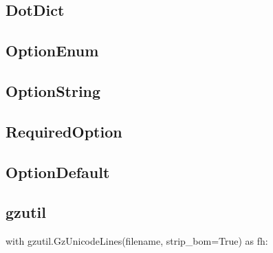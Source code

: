 \subsection{DotDict}

\subsection{OptionEnum}

\subsection{OptionString}

\subsection{RequiredOption}

\subsection{OptionDefault}

\subsection{gzutil}
\begin{python}
with gzutil.GzUnicodeLines(filename, strip_bom=True) as fh:
\end{python}
